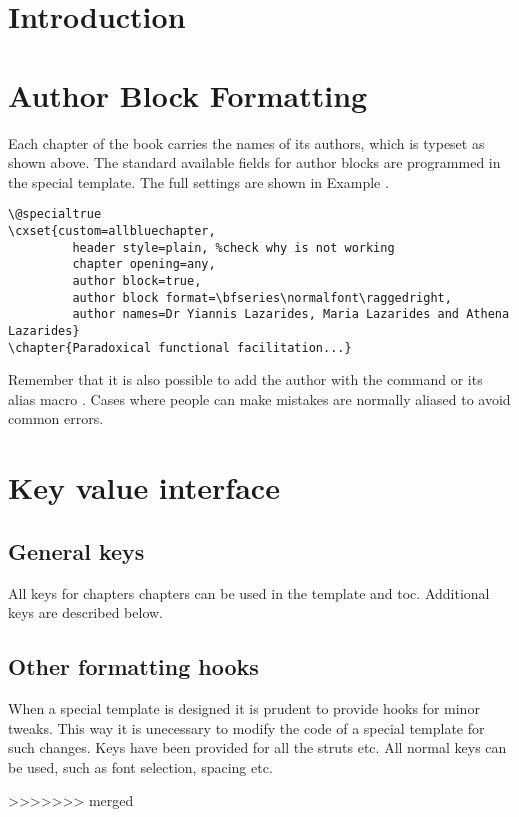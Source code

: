 \section{Introduction}
\lorem

\section{Author Block Formatting}

Each chapter of the book carries the names of its authors, which is typeset as shown above. The standard available fields for author blocks are programmed in the special template. The full settings are shown in Example .
\medskip

\noindent\begin{tcolorbox}
\begin{lstlisting}
\@specialtrue
\cxset{custom=allbluechapter,
         header style=plain, %check why is not working
         chapter opening=any,
         author block=true,
         author block format=\bfseries\normalfont\raggedright,
         author names=Dr Yiannis Lazarides, Maria Lazarides and Athena Lazarides}
\chapter{Paradoxical functional facilitation...}
\end{lstlisting}
\end{tcolorbox}

Remember that it is also possible to add the author with the command  or its alias macro . Cases where people can make mistakes are normally aliased to avoid common errors.

\section{Key value interface}
\subsection{General keys}
All keys for chapters chapters can be used in the template and toc.
Additional keys are described below.


\subsection{Other formatting hooks}

When a special template is designed it is prudent to provide hooks for minor tweaks. This way it is unecessary to modify the code of a special template for such changes. Keys have been provided for all the struts etc.
All normal keys can be used, such as font selection, spacing etc.

\lipsum
>>>>>>> merged
